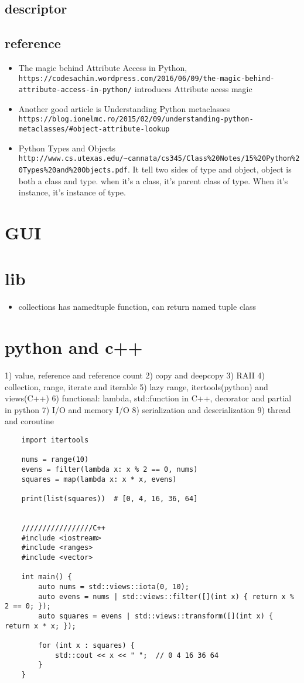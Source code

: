 \documentclass[a4paper,12pt,twoside]{book}
\begin{document}
\section{descriptor}
\section{reference}
\begin{itemize}
	\item The magic behind Attribute Access in Python, \verb|https://codesachin.wordpress.com/2016/06/09/the-magic-behind-attribute-access-in-python/|
	introduces Attribute acess magic
	\item Another good article is  Understanding Python metaclasses \verb|https://blog.ionelmc.ro/2015/02/09/understanding-python-metaclasses/#object-attribute-lookup|
	\item Python Types and Objects \verb|http://www.cs.utexas.edu/~cannata/cs345/Class%20Notes/15%20Python%20Types%20and%20Objects.pdf|. It tell two sides of type and object,  object is both a class and type. when it's a class, it's parent class of type. When it's instance, it's instance of type. 
\end{itemize}
\chapter{GUI}

\chapter{lib}
\begin{itemize}
	\item collections has namedtuple function, can return named tuple class
\end{itemize}

\chapter{python and c++}
1) value, reference and reference count
2) copy and deepcopy
3) RAII
4) collection, range, iterate and iterable
5) lazy range, itertools(python) and views(C++)
6) functional: lambda, std::function in C++, decorator and partial in python
7) I/O and memory I/O
8) serialization and deserialization 
9) thread and coroutine
\begin{lstlisting}
	import itertools
	
	nums = range(10)
	evens = filter(lambda x: x % 2 == 0, nums)
	squares = map(lambda x: x * x, evens)
	
	print(list(squares))  # [0, 4, 16, 36, 64]
	
	
	/////////////////C++
	#include <iostream>
	#include <ranges>
	#include <vector>
	
	int main() {
		auto nums = std::views::iota(0, 10);
		auto evens = nums | std::views::filter([](int x) { return x % 2 == 0; });
		auto squares = evens | std::views::transform([](int x) { return x * x; });
		
		for (int x : squares) {
			std::cout << x << " ";  // 0 4 16 36 64
		}
	}	
\end{lstlisting}






%
\end{document}
